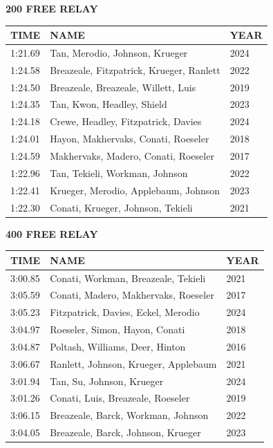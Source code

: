 \begin{table}[H]
\centering
\begin{minipage}[t]{0.6\textwidth}
\centering
\textbf{200 FREE RELAY}\\[0.1cm]
\begin{tabular}{@{}p{1.8cm}p{2.8cm}p{1.2cm}@{}}
\hline
    \textbf{TIME} & \textbf{NAME} & \textbf{YEAR} \\
\hline
    1:21.69 & Tan, Merodio, Johnson, Krueger & 2024 \\
    1:24.58 & Breazeale, Fitzpatrick, Krueger, Ranlett & 2022 \\
    1:24.50 & Breazeale, Breazeale, Willett, Luis & 2019 \\
    1:24.35 & Tan, Kwon, Headley, Shield & 2023 \\
    1:24.18 & Crewe, Headley, Fitzpatrick, Davies & 2024 \\
    1:24.01 & Hayon, Makhervaks, Conati, Roeseler & 2018 \\
    1:24.59 & Makhervaks, Madero, Conati, Roeseler & 2017 \\
    1:22.96 & Tan, Tekieli, Workman, Johnson & 2022 \\
    1:22.41 & Krueger, Merodio, Applebaum, Johnson & 2023 \\
    1:22.30 & Conati, Krueger, Johnson, Tekieli & 2021 \\
\hline
\end{tabular}
\end{minipage}
\end{table}

\begin{table}[H]
\centering
\begin{minipage}[t]{0.6\textwidth}
\centering
\textbf{400 FREE RELAY}\\[0.1cm]
\begin{tabular}{@{}p{1.8cm}p{2.8cm}p{1.2cm}@{}}
\hline
    \textbf{TIME} & \textbf{NAME} & \textbf{YEAR} \\
\hline
    3:00.85 & Conati, Workman, Breazeale, Tekieli & 2021 \\
    3:05.59 & Conati, Madero, Makhervaks, Roeseler & 2017 \\
    3:05.23 & Fitzpatrick, Davies, Eckel, Merodio & 2024 \\
    3:04.97 & Roeseler, Simon, Hayon, Conati & 2018 \\
    3:04.87 & Poltash, Williams, Deer, Hinton & 2016 \\
    3:06.67 & Ranlett, Johnson, Krueger, Applebaum & 2021 \\
    3:01.94 & Tan, Su, Johnson, Krueger & 2024 \\
    3:01.26 & Conati, Luis, Breazeale, Roeseler & 2019 \\
    3:06.15 & Breazeale, Barck, Workman, Johnson & 2022 \\
    3:04.05 & Breazeale, Barck, Johnson, Krueger & 2023 \\
\hline
\end{tabular}
\end{minipage}
\end{table}

